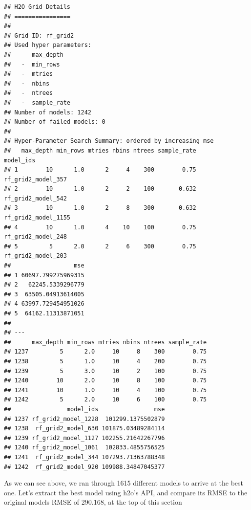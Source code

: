 \documentclass[]{article}
\newenvironment{Shaded}{\begin{snugshade}}{\end{snugshade}}
\newcommand{\KeywordTok}[1]{\textcolor[rgb]{0.13,0.29,0.53}{\textbf{#1}}}
\newcommand{\DecValTok}[1]{\textcolor[rgb]{0.00,0.00,0.81}{#1}}
\newcommand{\StringTok}[1]{\textcolor[rgb]{0.31,0.60,0.02}{#1}}
\newcommand{\CommentTok}[1]{\textcolor[rgb]{0.56,0.35,0.01}{\textit{#1}}}
\newcommand{\OperatorTok}[1]{\textcolor[rgb]{0.81,0.36,0.00}{\textbf{#1}}}
\newcommand{\NormalTok}[1]{#1}
\begin{document}
\begin{verbatim}
## H2O Grid Details
## ================
## 
## Grid ID: rf_grid2 
## Used hyper parameters: 
##   -  max_depth 
##   -  min_rows 
##   -  mtries 
##   -  nbins 
##   -  ntrees 
##   -  sample_rate 
## Number of models: 1242 
## Number of failed models: 0 
## 
## Hyper-Parameter Search Summary: ordered by increasing mse
##   max_depth min_rows mtries nbins ntrees sample_rate           model_ids
## 1        10      1.0      2     4    300        0.75  rf_grid2_model_357
## 2        10      1.0      2     2    100       0.632  rf_grid2_model_542
## 3        10      1.0      2     8    300       0.632 rf_grid2_model_1155
## 4        10      1.0      4    10    100        0.75  rf_grid2_model_248
## 5         5      2.0      2     6    300        0.75  rf_grid2_model_203
##                  mse
## 1 60697.799275969315
## 2   62245.5339296779
## 3  63505.04913614005
## 4 63997.729454951026
## 5  64162.11313871051
## 
## ---
##      max_depth min_rows mtries nbins ntrees sample_rate
## 1237         5      2.0     10     8    300        0.75
## 1238         5      1.0     10     4    200        0.75
## 1239         5      3.0     10     2    100        0.75
## 1240        10      2.0     10     8    100        0.75
## 1241        10      1.0     10     4    100        0.75
## 1242         5      2.0     10     6    100        0.75
##                model_ids                mse
## 1237 rf_grid2_model_1228  101299.1375502879
## 1238  rf_grid2_model_630 101875.03489284114
## 1239 rf_grid2_model_1127 102255.21642267796
## 1240 rf_grid2_model_1061  102833.4855756525
## 1241  rf_grid2_model_344 107293.71363788348
## 1242  rf_grid2_model_920 109988.34847045377
\end{verbatim}

As we can see above, we ran through 1615 different models to arrive at
the best one. Let's extract the best model using h2o's API, and compare
its RMSE to the original models RMSE of 290.168, at the top of this
section

\begin{Shaded}
\end{Shaded}
\end{document}

